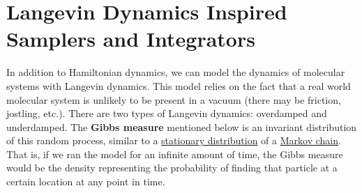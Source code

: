 \section{Langevin Dynamics Inspired Samplers and Integrators}

    In addition to Hamiltonian dynamics, we can model the dynamics of molecular systems with Langevin dynamics. This model relies on the fact that a real world molecular system is unlikely to be present in a vacuum (there may be friction, jostling, etc.). There are two types of Langevin dynamics: overdamped and underdamped. The \textbf{Gibbs measure} mentioned below is an invariant distribution of this random process, similar to a \hyperref[sp-def:stationary-distribution]{stationary distribution} of a \hyperref[sp-def:markov-chain]{Markov chain}. That is, if we ran the model for an infinite amount of time, the Gibbs measure would be the density representing the probability of finding that particle at a certain location at any point in time. 
